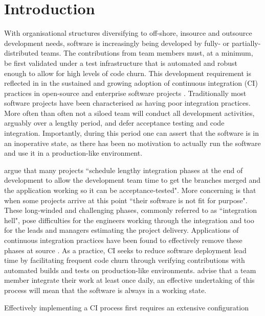 \documentclass{report}
\begin{document}

\section{Introduction}
With organisational structures diversifying to off-shore, insource and outsource
development needs, software is increasingly being developed by fully- or 
partially-distributed teams. The contributions from team members must, at a minimum, be first validated
under a test infrastructure that is automated and robust enough to allow for
high levels of code churn. This development requirement is reflected in 
in the sustained and growing adoption of continuous integration (CI) practices in open-source and enterprise software projects \citep{Duvall, Fitz, Vas}. Traditionally most software projects have been characterised as having
poor integration practices. More often than often not a siloed team 
will conduct all development activities, arguably over a lengthy period,
and defer acceptance testing and code integration. Importantly, during
this period one can assert that the software is in an inoperative state, as there has
been no motivation to actually run the software and use it in a
production-like environment.
\par 
\citet{Jez} argue that many projects ``schedule lengthy integration phases at
the end of development to allow the development team time to get the branches
merged and the application working so it can be acceptance-tested". More concerning
is that when some projects arrive at this point ``their software is not fit for
purpose". These long-winded and challenging phases, commonly referred
to as ``integration hell", pose difficulties for the engineers working through the integration
and too for the leads and managers estimating the project delivery.
Applications of continuous integration practices have been found to effectively 
remove these phases at source \citep{Vas, Fitz, Jez, Duvall}. As a practice, CI seeks to reduce software deployment lead time by
facilitating frequent code churn through verifying contributions with automated 
builds and tests on production-like environments. \citet{Jez} advise that a team member integrate their work at least once daily, an effective undertaking of this process will mean that the software is always in a working state. 
\par
Effectively implementing a CI process first requires an extensive configuration
\end{document}
